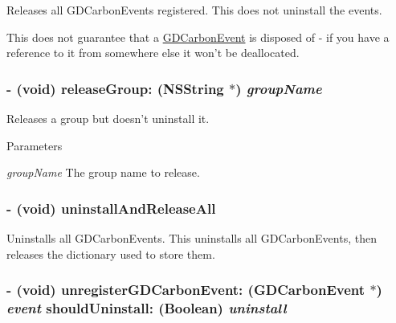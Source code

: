 Releases all GDCarbonEvents registered. This does not uninstall the events.

This does not guarantee that a \hyperlink{interface_g_d_carbon_event}{GDCarbonEvent} is disposed of -\/ if you have a reference to it from somewhere else it won't be deallocated. \hypertarget{interface_g_d_carbon_event_manager_a7959c7e44bc31f132278d2d5f10054cf}{
\subsubsection[{releaseGroup:}]{\setlength{\rightskip}{0pt plus 5cm}-\/ (void) releaseGroup: ({\bf NSString} $\ast$) {\em groupName}}}
\label{interface_g_d_carbon_event_manager_a7959c7e44bc31f132278d2d5f10054cf}


Releases a group but doesn't uninstall it. 
\begin{DoxyParams}{Parameters}
\item[{\em groupName}]The group name to release. \end{DoxyParams}
\hypertarget{interface_g_d_carbon_event_manager_ab4b42a2fa05a8c48d8d99733f265d2c6}{
\subsubsection[{uninstallAndReleaseAll}]{\setlength{\rightskip}{0pt plus 5cm}-\/ (void) uninstallAndReleaseAll }}
\label{interface_g_d_carbon_event_manager_ab4b42a2fa05a8c48d8d99733f265d2c6}


Uninstalls all GDCarbonEvents. This uninstalls all GDCarbonEvents, then releases the dictionary used to store them. \hypertarget{interface_g_d_carbon_event_manager_a786c5f3fb13179cec26b22d240c5cc53}{
\subsubsection[{unregisterGDCarbonEvent:shouldUninstall:}]{\setlength{\rightskip}{0pt plus 5cm}-\/ (void) unregisterGDCarbonEvent: ({\bf GDCarbonEvent} $\ast$) {\em event}\/ shouldUninstall: (Boolean) {\em uninstall}}}
\label{interface_g_d_carbon_event_manager_a786c5f3fb13179cec26b22d240c5cc53}


